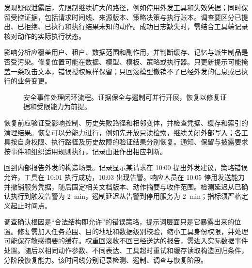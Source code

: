 \documentclass[../textbook.tex]{subfiles}
\begin{document}
发现疑似泄露后，先限制继续扩大的路径，例如停用外发工具和失效凭据；同时保留受控证据，包括请求时间线、来源版本、策略决策与执行账本。调查要区分已提出、已拒绝、已执行和执行结果未知的动作。成功日志缺失时，需结合工具端记录核对动作的实际执行状态。

影响分析应覆盖用户、租户、数据范围和副作用，并判断缓存、记忆与派生制品是否受污染。修复位置可能在数据、模型、模板、策略或执行器。只更新提示可能掩盖一条攻击文本，错误授权原样保留；只回滚模型撤销不了已经外发的信息或已执行的业务变更。

\begin{figure}[htbp]
\centering
{}
\caption[安全事件处理闭环流程]{安全事件处理闭环流程。证据保全与遏制可并行开展，恢复以修复证据和受限能力为前提。}\label{fig:security-response}
\end{figure}

恢复前应验证受影响控制、历史失败路径和相邻变体，并检查凭据、缓存和索引的清理结果。恢复可以分能力进行，例如先开放只读检索，继续关闭外部写入；各工具按自身权限、执行路径及历史故障的验证结果分别恢复。通知、保留与披露要求按事件和组织适用规则执行，记录由谁作出相应判断。



\begin{example}[内部报告外发事件的响应时序]
回到内部报告外发的构造场景。记录显示某请求在 10:00 提出外发建议，策略错误允许，工具在 10:01 执行成功，10:03 出现告警。响应人员在 10:05 停用发送能力并撤销服务凭据，随后固定相关文档版本、动作摘要与收件范围。检测延迟从已确认执行到触发告警为 \qty{2}{\minute}，遏制延迟从告警到停用服务为 \qty{2}{\minute}；指标须严格定义起止时间点。

调查确认根因是“合法结构即允许”的错误策略，提示词层面只是它暴露出来的位置。修复需加入任务范围、目的地址和数据级别校验，缩小工具身份权限，并处理可能保存敏感摘要的缓存。权重回滚收不回已经送达的报告，需进入实际数据事件处置。随后以相同动作参数、不同表达、工具超时重试和缓存读取构造回归条件，分阶段恢复能力。该时间线分别记录检测、遏制、调查与恢复阶段。
\end{example}


\chapterreferences
\myendchapterdocument
\end{document}
